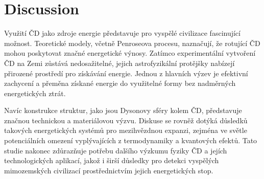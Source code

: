 \documentclass[
	a4paper, %
	10pt, %
	unnumberedsections, %
	twoside, %
]{LTJournalArticle}
\begin{document}

\section{Discussion}

Využití ČD jako zdroje energie představuje pro vyspělé civilizace fascinující možnost. Teoretické modely, včetně Penroseova procesu, naznačují, že rotující ČD mohou poskytovat značné energetické výnosy. Zatímco experimentální vytvoření ČD na Zemi zůstává nedosažitelné, jejich astrofyzikální protějšky nabízejí přirozené prostředí pro získávání energie. Jednou z hlavních výzev je efektivní zachycení a přeměna získané energie do využitelné formy bez nadměrných energetických ztrát.

Navíc konstrukce struktur, jako jsou Dysonovy sféry kolem ČD, představuje značnou technickou a materiálovou výzvu. Diskuse se rovněž dotýká důsledků takových energetických systémů pro mezihvězdnou expanzi, zejména ve světle potenciálních omezení vyplývajících z termodynamiky a kvantových efektů. Tato studie nakonec zdůrazňuje potřebu dalšího výzkumu fyziky ČD a jejích technologických aplikací, jakož i širší důsledky pro detekci vyspělých mimozemských civilizací prostřednictvím jejich energetických stop.


\printbibliography %
\end{document}
